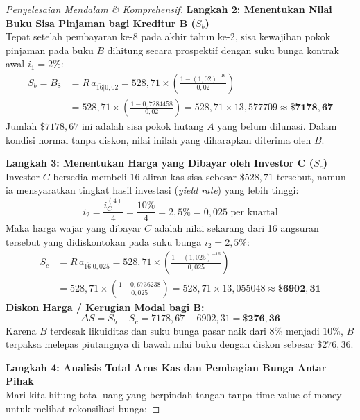 \documentclass[11pt,a4paper]{article}
\begin{document}
\begin{proof}[Penyelesaian Mendalam \& Komprehensif]
\noindent\textbf{Langkah 2: Menentukan Nilai Buku Sisa Pinjaman bagi Kreditur B ($S_b$)}\\[0.3em]
Tepat setelah pembayaran ke-8 pada akhir tahun ke-2, sisa kewajiban pokok pinjaman pada buku $B$ dihitung secara prospektif dengan suku bunga kontrak awal $i_1 = 2\%$:
\begin{align*}
    S_b = B_8 &= R \, a_{\overline{16}|0{,}02} = 528{,}71 \times \left( \frac{1 - (1{,}02)^{-16}}{0{,}02} \right) \\
    &= 528{,}71 \times \left( \frac{1 - 0{,}7284458}{0{,}02} \right) = 528{,}71 \times 13{,}577709 \approx \mathbf{\$7178{,}67}
\end{align*}
Jumlah $\$7178{,}67$ ini adalah sisa pokok hutang $A$ yang belum dilunasi. Dalam kondisi normal tanpa diskon, nilai inilah yang diharapkan diterima oleh $B$.

\noindent\textbf{Langkah 3: Menentukan Harga yang Dibayar oleh Investor C ($S_c$)}\\[0.3em]
Investor $C$ bersedia membeli 16 aliran kas sisa sebesar $\$528{,}71$ tersebut, namun ia mensyaratkan tingkat hasil investasi (\textit{yield rate}) yang lebih tinggi:
\begin{equation*}
    i_2 = \frac{i_C^{(4)}}{4} = \frac{10\%}{4} = 2{,}5\% = 0{,}025 \text{ per kuartal}
\end{equation*}
Maka harga wajar yang dibayar $C$ adalah nilai sekarang dari 16 angsuran tersebut yang didiskontokan pada suku bunga $i_2 = 2{,}5\%$:
\begin{align*}
    S_c &= R \, a_{\overline{16}|0{,}025} = 528{,}71 \times \left( \frac{1 - (1{,}025)^{-16}}{0{,}025} \right) \\
    &= 528{,}71 \times \left( \frac{1 - 0{,}6736238}{0{,}025} \right) = 528{,}71 \times 13{,}055048 \approx \mathbf{\$6902{,}31}
\end{align*}
\textbf{Diskon Harga / Kerugian Modal bagi B:}
\begin{equation*}
    \Delta S = S_b - S_c = 7178{,}67 - 6902{,}31 = \mathbf{\$276{,}36}
\end{equation*}
Karena $B$ terdesak likuiditas dan suku bunga pasar naik dari $8\%$ menjadi $10\%$, $B$ terpaksa melepas piutangnya di bawah nilai buku dengan diskon sebesar $\$276{,}36$.

\noindent\textbf{Langkah 4: Analisis Total Arus Kas dan Pembagian Bunga Antar Pihak}\\[0.3em]
Mari kita hitung total uang yang berpindah tangan tanpa time value of money untuk melihat rekonsiliasi bunga:


\end{proof}
\end{document}
